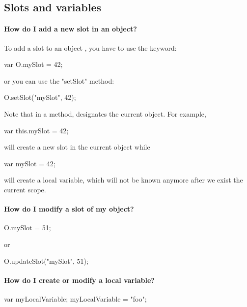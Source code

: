 \subsection{Slots and variables}

\paragraph{How do I add a new slot in an object?}
To add a slot to an object , you have to use the  keyword:

\begin{urbifixme}
var O.mySlot = 42;
\end{urbifixme}

\noindent
or you can use the "setSlot" method:

\begin{urbifixme}
O.setSlot("mySlot", 42);
\end{urbifixme}

Note that in a method,  designates the current object. For example,

\begin{urbifixme}
var this.mySlot = 42;
\end{urbifixme}

\noindent
will create a new slot in the current object while

\begin{urbifixme}
var mySlot = 42;
\end{urbifixme}

\noindent
will create a local variable, which will not be known anymore after we
exist the current scope.

\paragraph{How do I modify a slot of my object?}
\begin{urbifixme}
O.mySlot = 51;
\end{urbifixme}

\noindent
or

\begin{urbifixme}
O.updateSlot("mySlot", 51);
\end{urbifixme}

\paragraph{How do I create or modify a local variable?}
\begin{urbifixme}
var myLocalVariable;
myLocalVariable = "foo";
\end{urbifixme}

